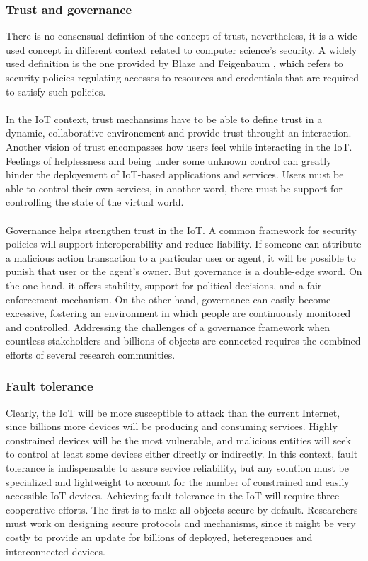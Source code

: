 \documentclass[10pt, twocolumn]{article}
\begin{document}
\subsubsection{Trust and governance}
There is no consensual defintion of the concept of trust, nevertheless, it is a wide used concept in different context related to computer science's security. A widely used definition is the one provided by Blaze and Feigenbaum \cite{ref13}, which refers to security policies regulating accesses to resources and credentials that are required to satisfy such policies.
\paragraph{}
In the IoT context, trust mechansims have to be able to define trust in a dynamic, collaborative environement and provide trust throught an interaction. Another vision of trust encompasses how users feel while interacting in the IoT. Feelings of helplessness and being under some unknown control can greatly hinder the deployement of IoT-based applications and services. Users must be able to control their own services, in another word, there must be support for controlling the state of the virtual world.
\paragraph{}
Governance helps strengthen trust in the IoT. A common framework for security policies will support interoperability and reduce liability. If someone can attribute a malicious action  transaction to a particular user or agent, it will be possible to punish that user or the agent's owner. But governance is a double-edge sword. On the one hand, it offers stability, support for political decisions, and a fair enforcement mechanism. On the other hand, governance can easily become excessive, fostering an 
environment in which people are continuously monitored and controlled. Addressing the challenges of a governance framework when countless stakeholders and billions of objects are connected requires the combined efforts of several research communities\cite{ref11}.

\subsubsection{Fault tolerance}
Clearly, the IoT will be more susceptible to attack than the current Internet, since billions more devices will be producing and consuming services. Highly constrained devices will be the most vulnerable, and malicious entities will seek to control at least some devices either directly or indirectly. In this context, fault tolerance is indispensable to assure service reliability, but any solution must be specialized and lightweight to account for the number of constrained and easily accessible IoT devices. 
Achieving fault tolerance in the IoT will require three cooperative efforts. The first is to make all objects secure by default.
Researchers must work on designing secure protocols and mechanisms, since it might be very costly to provide an update for billions of deployed, heteregenoues and interconnected devices.
\end{document}
